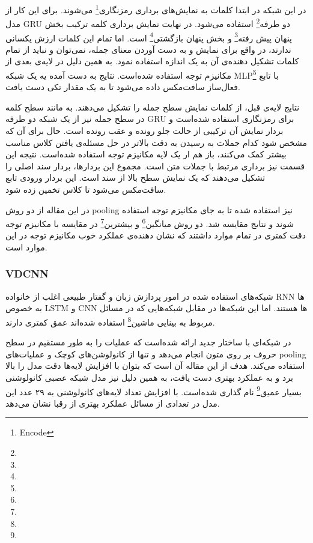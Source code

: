 \documentclass[12pt, a4paper, oneside]{report}
\begin{document}
در این شبکه در ابتدا کلمات به نمایش‌های برداری
رمزنگاری\footnote{Encode}
می‌شوند. برای این کار از مدل
GRU
دو طرفه\footnote{}
استفاده می‌شود. در نهایت نمایش برداری کلمه ترکیب 
بخش پنهان پیش رفته\footnote{}
و 
بخش پنهان بازگشتی\footnote{}
است. اما تمام این کلمات ارزش یکسانی ندارند، در واقع برای نمایش و به دست آوردن معنای جمله، نمی‌توان و نباید
از تمام کلمات تشکیل دهنده‌ی آن به یک اندازه استفاده نمود. به همین دلیل در لایه‌ی بعدی از مکانیزم توجه
استفاده شده‌است. نتایج به دست آمده یه یک شبکه
MLP\footnote{}
با تابع فعال‌ساز سافت‌مکس داده می‌شود تا به یک مقدار تکی دست یافت.

نتایج لایه‌ی قبل، از کلمات نمایش سطح  جمله را تشکیل می‌دهند.
به مانند سطح کلمه در سطح جمله نیز از یک شبکه دو طرفه
GRU
برای رمزنگاری استفاده شده‌است و بردار نمایش آن ترکیبی از حالت جلو رونده و عقب رونده است.
حال برای آن که مشخص شود کدام جملات به رسیدن به دقت بالاتر در حل مسئله‌ی یافتن
کلاس مناسب بیشتر کمک می‌کنند، باز هم ار یک لایه مکانیزم توجه استفاده شده‌است. نتیجه این
قسمت نیز برداری مرتبط با جملات متن است. مجموع این بردار‌ها، بردار سند اصلی را تشکیل می‌دهند
که یک نمایش سطح بالا از سند است. این بردار ورودی تابع سافت‌مکس می‌شود تا کلاس تخمین زده شود.

در این مقاله از دو روش
pooling
نیز استفاده شده تا به جای مکانیزم توجه استفاده شوند و نتایج مقایسه شد. 
دو روش
میانگین\footnote{}
و
بیشترین\footnote{}
در مقایسه با مکانیزم توجه دقت کمتری در تمام موارد داشتند که نشان دهنده‌ی عملکرد خوب مکانیزم توجه در این موارد است.

\subsubsection{VDCNN}

شبکه‌های استفاده شده در امور پردازش زبان و گفتار طبیعی اغلب از خانواده
RNN
ها به خصوص
LSTM
و
CNN
ها هستند. اما این شبکه‌ها در مقابل شبکه‌هایی که در مسائل مربوط به 
بینایی ماشین\footnote{}
استفاده شده‌اند عمق کمتری دارند.

در
\cite{conneau2016very}
شبکه‌ای با ساختار جدید ارائه شده‌است که عملیات را به طور مستقیم در سطح حروف بر روی متون انجام می‌دهد
و تنها از کانولوشن‌های کوچک و عملیات‌های
pooling
استفاده می‌کند. هدف از این مقاله آن است که بتوان با افزایش لایه‌ها دقت مدل را بالا برد و به عملکرد بهتری
دست یافت، به همین دلیل نیز مدل
شبکه عصبی کانولوشنی بسیار عمیق\footnote{}
نام گذاری شده‌است.
با افزایش تعداد لایه‌های کانولوشنی به ۲۹ عدد این مدل در تعدادی از مسائل عملکرد بهتری از
رقبا نشان می‌دهد.
\end{document}
